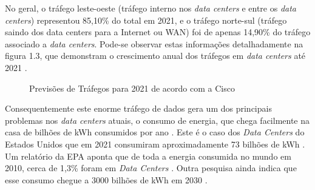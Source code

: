 No geral, o tráfego leste-oeste (tráfego interno nos \emph{data centers} e entre os \emph{data centers}) representou 85,10\% do total em 2021, e o tráfego norte-sul (tráfego saindo dos data centers para a Internet ou WAN) foi de apenas 14,90\% do tráfego associado a \emph{data centers}. Pode-se observar estas informações detalhadamente na figura 1.3, que demonstram o crescimento anual dos tráfegos em \emph{data centers} até 2021 \cite{index2018forecast}.

\begin{figure}[!htb]
    \centering
    \label{fig:subfig}
    \hfill
    \caption{Previsões de Tráfegos para 2021 de acordo com a Cisco}
    \cite{index2018forecast}
\end{figure}

Consequentemente este enorme tráfego de dados gera um dos principais problemas nos \emph{data centers} atuais, o consumo de energia, que chega facilmente na casa de bilhões de kWh consumidos por ano \cite{raizada2020worldwide}. Este é o caso dos \emph{Data Centers} do Estados Unidos que em 2021 consumiram aproximadamente 73 bilhões de kWh \cite{shehabi2016united}. Um relatório da EPA aponta que de toda a energia consumida no mundo em 2010, cerca de 1,3\% foram em \emph{Data Centers} \cite{koomey2011growth}. Outra pesquisa ainda indica que esse consumo chegue a 3000 bilhões de kWh em 2030 \cite{raizada2020worldwide}.

